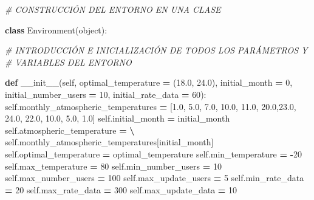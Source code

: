 \documentclass[
]{book}
\newenvironment{Shaded}{\begin{snugshade}}{\end{snugshade}}
\newcommand{\BuiltInTok}[1]{#1}
\newcommand{\CommentTok}[1]{\textcolor[rgb]{0.56,0.35,0.01}{\textit{#1}}}
\newcommand{\DecValTok}[1]{\textcolor[rgb]{0.00,0.00,0.81}{#1}}
\newcommand{\FloatTok}[1]{\textcolor[rgb]{0.00,0.00,0.81}{#1}}
\newcommand{\FunctionTok}[1]{\textcolor[rgb]{0.00,0.00,0.00}{#1}}
\newcommand{\KeywordTok}[1]{\textcolor[rgb]{0.13,0.29,0.53}{\textbf{#1}}}
\newcommand{\NormalTok}[1]{#1}
\newcommand{\OperatorTok}[1]{\textcolor[rgb]{0.81,0.36,0.00}{\textbf{#1}}}
\newcommand{\VariableTok}[1]{\textcolor[rgb]{0.00,0.00,0.00}{#1}}
\begin{document}
\begin{Shaded}
\begin{Highlighting}[]
\CommentTok{\# CONSTRUCCIÓN DEL ENTORNO EN UNA CLASE}

\KeywordTok{class}\NormalTok{ Environment(}\BuiltInTok{object}\NormalTok{):}
    
    \CommentTok{\# INTRODUCCIÓN E INICIALIZACIÓN DE TODOS LOS PARÁMETROS Y }
    \CommentTok{\# VARIABLES DEL ENTORNO}
    
    \KeywordTok{def} \FunctionTok{\_\_init\_\_}\NormalTok{(}\VariableTok{self}\NormalTok{,}
\NormalTok{                optimal\_temperature }\OperatorTok{=}\NormalTok{ (}\FloatTok{18.0}\NormalTok{, }\FloatTok{24.0}\NormalTok{),}
\NormalTok{                initial\_month }\OperatorTok{=} \DecValTok{0}\NormalTok{,}
\NormalTok{                initial\_number\_users }\OperatorTok{=} \DecValTok{10}\NormalTok{,}
\NormalTok{                initial\_rate\_data }\OperatorTok{=} \DecValTok{60}\NormalTok{):}
        \VariableTok{self}\NormalTok{.monthly\_atmospheric\_temperatures }\OperatorTok{=}\NormalTok{ [}\FloatTok{1.0}\NormalTok{, }\FloatTok{5.0}\NormalTok{, }\FloatTok{7.0}\NormalTok{, }\FloatTok{10.0}\NormalTok{, }\FloatTok{11.0}\NormalTok{, }
                                      \FloatTok{20.0}\NormalTok{,}\FloatTok{23.0}\NormalTok{, }\FloatTok{24.0}\NormalTok{, }\FloatTok{22.0}\NormalTok{, }\FloatTok{10.0}\NormalTok{, }\FloatTok{5.0}\NormalTok{, }\FloatTok{1.0}\NormalTok{]}
        \VariableTok{self}\NormalTok{.initial\_month }\OperatorTok{=}\NormalTok{ initial\_month}
        \VariableTok{self}\NormalTok{.atmospheric\_temperature }\OperatorTok{=} \OperatorTok{\textbackslash{}}
                            \VariableTok{self}\NormalTok{.monthly\_atmospheric\_temperatures[initial\_month]}
        \VariableTok{self}\NormalTok{.optimal\_temperature }\OperatorTok{=}\NormalTok{ optimal\_temperature}
        \VariableTok{self}\NormalTok{.min\_temperature }\OperatorTok{=} \OperatorTok{{-}}\DecValTok{20}
        \VariableTok{self}\NormalTok{.max\_temperature }\OperatorTok{=} \DecValTok{80}
        \VariableTok{self}\NormalTok{.min\_number\_users }\OperatorTok{=} \DecValTok{10}
        \VariableTok{self}\NormalTok{.max\_number\_users }\OperatorTok{=} \DecValTok{100}
        \VariableTok{self}\NormalTok{.max\_update\_users }\OperatorTok{=} \DecValTok{5}
        \VariableTok{self}\NormalTok{.min\_rate\_data }\OperatorTok{=} \DecValTok{20}
        \VariableTok{self}\NormalTok{.max\_rate\_data }\OperatorTok{=} \DecValTok{300}
        \VariableTok{self}\NormalTok{.max\_update\_data }\OperatorTok{=} \DecValTok{10}

\end{Highlighting}
\end{Shaded}
\end{document}

